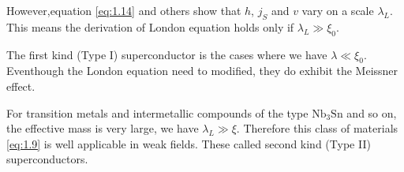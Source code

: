 However,equation \eqref{eq:1.14} and others show that $h$, $j_S$ and $v$ vary on a scale $\lambda_L$.
This means the derivation of London equation holds only if $\lambda_L \gg \xi_0$.

The first kind (Type I) superconductor is the cases where we have $\lambda \ll \xi_0$.
Eventhough the London equation need to modified, they do exhibit the Meissner effect.

For transition metals and intermetallic compounds of the type $\mathrm{Nb}_3\mathrm{Sn}$ and so on, the effective mass is very large, we have $\lambda_L \gg \xi$.
Therefore this class of materials \eqref{eq:1.9} is well applicable in weak fields.
These called second kind (Type II) superconductors.



